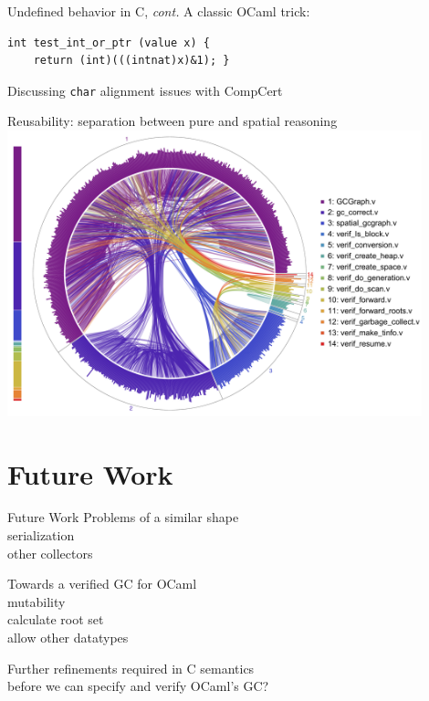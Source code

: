 \documentclass[usenames, xcolor=dvipsnames]{beamer}
\begin{document}
\begin{frame}[fragile]{Undefined behavior in C, \emph{cont.}}  
A classic OCaml trick:
    \begin{Verbatim}
int test_int_or_ptr (value x) {
    return (int)(((intnat)x)&1); }
    \end{Verbatim}
    \pause Discussing \texttt{char} alignment issues with CompCert
    \end{frame}



\begin{frame}{Reusability: separation between pure and spatial reasoning}
  \centering
  \includegraphics[width=0.9\textwidth]{certigc_theorems.pdf}
\end{frame}

\section{Future Work}
\begin{frame}{Future Work}
  Problems of a \alert{similar shape} \\
  \pause 
  \hspace{1em}serialization \\ 
  \hspace{1em}other collectors

  \bigskip

  \pause
  Towards a verified GC for \alert{OCaml} \\
  \pause 
  \hspace{1em}mutability \\ 
  \hspace{1em}calculate root set \\ 
  \hspace{1em}allow other datatypes

  \bigskip
  \pause \alert{Further refinements} required in C semantics \\ 
  \hspace{1em}before we can \alert{specify} and \alert{verify} OCaml's GC?
  \end{frame}
\end{document}
